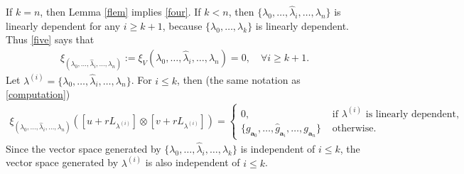 \documentclass[12pt,amstex,amssymb]{article}
\theoremstyle{plain}
\theoremstyle{definition}
\def\Q{{\mathbb Q}}
\def\l{\lambda}
\newcommand{\be}{\begin{eqnarray*}}
\newcommand{\ee}{\end{eqnarray*}}
\newcommand{\bea}{\begin{eqnarray}}
\newcommand{\eea}{\end{eqnarray}}
\newcommand{\ba}{\mathbf{a}}
\begin{document}
{%
%
%
If $k=n$, then Lemma \ref{flem} implies \eqref{four}.
If $k < n$, then $\{ \l_0,  \ldots, \hat \l_i, \ldots, \l_{n}\}$ is linearly dependent for any $ i \geq k+1$, because $\{\l_0, \ldots, \l_k\}$ is linearly dependent. Thus \eqref{five} says that
\bea \label{firstn}
\xi_{(\l_0, \ldots, \hat \l_i, \ldots, \l_{n})}:=\xi_V(\l_0,  \ldots, \hat \l_i, \ldots, \l_{n} )=0, \quad \forall i \geq k+1.
\eea
Let $\l^{(i)}=\{\l_0,  \ldots, \hat \l_i, \ldots, \l_{n}  \}$. For $i \leq k$, then (the same notation as \eqref{computation})
\bea \label{anothercon}
\xi_{(\l_0,  \ldots, \hat \l_i, \ldots, \l_{n} )}([u+rL_{ \l^{(i)}}]\otimes [v+rL_{ \l^{(i)}} ])=
\begin{cases}
0, & \text{ if } \l^{(i)} \text { is linearly dependent,} \\
\{g_{\ba_{0}}, \ldots, \hat g_{\ba_i}, \ldots, g_{\ba_n} \} &  \text{ otherwise. }
\end{cases}
\eea
Since the vector space generated by $\{\l_0, \ldots, \hat\l_i, \ldots, \l_k\}$ is independent of $i \leq k$, the vector space generated by $\l^{(i)}$ is also independent of $i \leq k$.


}
\end{document}
